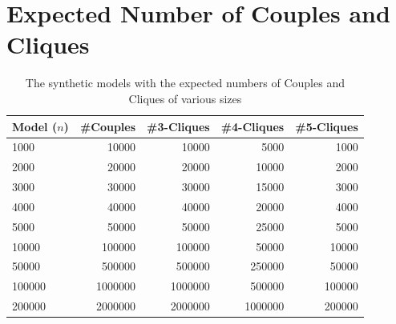 \documentclass[a4paper,11pt]{article}
\begin{document}



\newpage
\appendix

\section{Expected Number of Couples and Cliques}
\label{sec:expected-numbers}

\begin{table}[!ht]
  \centering
  \begin{tabular}{| l | r | r | r | r |}
    \hline
    \textbf{Model (\(n\))} & \textbf{\#Couples} & \textbf{\#3-Cliques} & \textbf{\#4-Cliques} & \textbf{\#5-Cliques}\\
    \hline
    1000   & 10000   & 10000   & 5000    & 1000\\
    2000   & 20000   & 20000   & 10000   & 2000\\
    3000   & 30000   & 30000   & 15000   & 3000\\
    4000   & 40000   & 40000   & 20000   & 4000\\
    5000   & 50000   & 50000   & 25000   & 5000\\
    10000  & 100000  & 100000  & 50000   & 10000\\
    50000  & 500000  & 500000  & 250000  & 50000\\
    100000 & 1000000 & 1000000 & 500000  & 100000\\
    200000 & 2000000 & 2000000 & 1000000 & 200000\\
    \hline
\end{tabular}
\caption{The synthetic models with the expected numbers of Couples and Cliques of various sizes}
\label{tab:synthetic-numbers}
\end{table}
\end{document}
